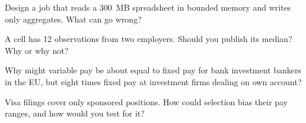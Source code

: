 \begin{interviewq}\label{iq:in:pay-levels-by-role-firm-type-and-seniority:3}
Design a job that reads a 300~MB spreadsheet in bounded memory and writes only aggregates. What can go wrong?
\end{interviewq}

\begin{interviewq}\label{iq:in:pay-levels-by-role-firm-type-and-seniority:4}
A cell has 12 observations from two employers. Should you publish its median? Why or why not?
\end{interviewq}

\begin{interviewq}\label{iq:in:pay-levels-by-role-firm-type-and-seniority:5}
Why might variable pay be about equal to fixed pay for bank investment bankers in the EU, but eight times fixed pay at
investment firms dealing on own account?
\end{interviewq}

\begin{interviewq}\label{iq:in:pay-levels-by-role-firm-type-and-seniority:6}
Visa filings cover only sponsored positions. How could selection bias their pay ranges, and how would you test for it?
\end{interviewq}
